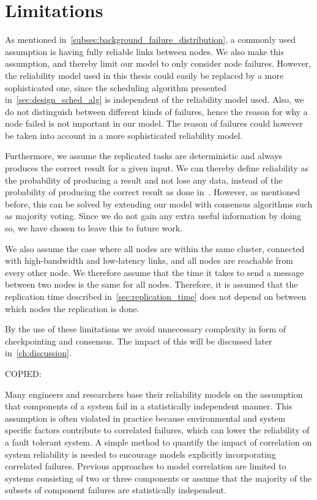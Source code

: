 \documentclass{cslthse-msc}
\begin{document}
\section{Limitations} \label{sec:design_limitations}
As mentioned in~\cref{subsec:background_failure_distribution}, a commonly used assumption is having fully reliable links between nodes. We also make this assumption, and thereby limit our model to only consider node failures. However, the reliability model used in this thesis could easily be replaced by a more sophisticated one, since the scheduling algorithm presented in~\cref{sec:design_sched_alg} is independent of the reliability model used. Also, we do not distinguish between different kinds of failures, hence the reason for why a node failed is not important in our model. The reason of failures could however be taken into account in a more sophisticated reliability model.

Furthermore, we assume the replicated tasks are deterministic and always produces the correct result for a given input. We can thereby define reliability as the probability of producing a result and not lose any data, instead of the probability of producing the correct result as done in~\cite{selfAdaptRel, dynAdaptRepl, relModelWebServices}. However, as mentioned before, this can be solved by extending our model with consensus algorithms such as majority voting. Since we do not gain any extra useful information by doing so, we have chosen to leave this to future work.

We also assume the case where all nodes are within the same cluster, connected with high-bandwidth and low-latency links, and all nodes are reachable from every other node. We therefore assume that the time it takes to send a message between two nodes is the same for all nodes. Therefore, it is assumed that the replication time described in~\cref{sec:replication_time} does not depend on between which nodes the replication is done.

By the use of these limitations we avoid unnecessary complexity in form of checkpointing and consensus. The impact of this will be discussed later in~\cref{ch:discussion}.


\iffalse
COPIED:

Many engineers and researchers base their reliability models on the assumption that components of a system fail in a statistically independent manner. This assumption is often violated in practice because environmental and system specific factors contribute to correlated failures, which can lower the reliability of a fault tolerant system. A simple method to quantify the impact of correlation on system reliability is needed to encourage models explicitly incorporating correlated failures. Previous approaches to model correlation are limited to systems consisting of two or three components or assume that the majority of the subsets of component failures are statistically independent. \cite{discContRelModel}
\end{document}
